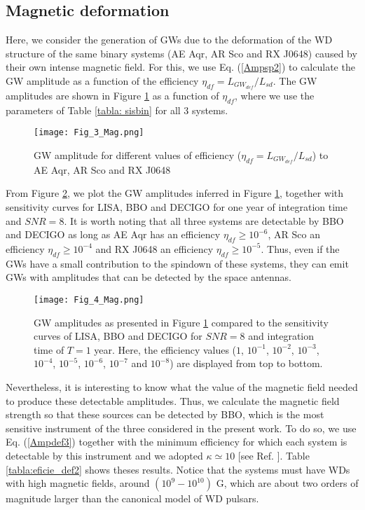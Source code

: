 \documentclass{ws-procs961x669}            %
\begin{document}
\subsection{Magnetic deformation}

Here, we consider the generation of GWs due to the deformation of the WD structure of the same binary systems (AE Aqr, AR Sco and RX J0648) caused by their own intense magnetic field. For this, we use Eq. (\ref{Ampsp2}) to calculate the GW amplitude as a function of the efficiency $\eta_{df} = L_{GW_{def}}/L_{sd}$. The GW amplitudes are shown in Figure \ref{fig:3} as a function of $\eta_{df}$, where we use the parameters of Table \ref{tabla: sisbin} for all 3 systems.

\begin{figure}
\begin{center}
\texttt{[image: Fig\_3\_Mag.png]}
\caption{GW amplitude for different values of efficiency ($\eta_{df} = L_{GW_{def}}/L_{sd}$) to AE Aqr, AR Sco and RX J0648}
\label{fig:3} 
\end{center}
\end{figure}


From Figure \ref{fig:4}, we plot the GW amplitudes inferred in Figure \ref{fig:3}, together with sensitivity curves for LISA, BBO and DECIGO for one year of integration time and $SNR = 8$. It is worth noting that all three systems are detectable by BBO and DECIGO as long as AE Aqr has an efficiency $\eta_{df} \geq  10^{-6}$, AR Sco an efficiency $\eta_{df} \geq  10^{-4}$ and RX J0648 an efficiency $\eta_{df} \geq  10^{-5}$. Thus, even if the GWs have a small contribution to the spindown of these systems, they can emit GWs with amplitudes that can be detected by the space antennas. 


\begin{figure}
\begin{center}
\texttt{[image: Fig\_4\_Mag.png]}
\caption{GW amplitudes as presented in Figure \ref{fig:3} compared to the sensitivity curves of LISA, BBO and DECIGO for $SNR = 8$ and integration time of $T = 1$ year. Here, the efficiency values ($1$, $10^{-1}$, $10^{-2}$, $10^{-3}$, $10^{-4}$, $10^{-5}$, $10^{-6}$, $10^{-7}$ and $10^{-8}$) are displayed from top to bottom.}
\label{fig:4} 
\end{center}
\end{figure}


Nevertheless, it is interesting to know what the value of the magnetic field needed to produce these detectable amplitudes. Thus, we calculate the magnetic field strength so that these sources can be detected by BBO, which is the most sensitive instrument of the three considered in the present work. To do so, we use Eq. (\ref{Ampdef3}) together with the minimum efficiency for which each system is detectable by this instrument and we adopted $\kappa\simeq 10$ [see Ref. ]. Table \ref{tabla:eficie_def2} shows theses results. Notice that the systems must have WDs with high magnetic fields, around $(10^{9} - 10^{10})$ G, which are about two orders of magnitude larger than the canonical model of WD pulsars.
\end{document}

